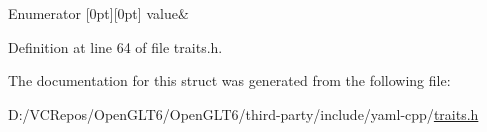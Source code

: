 \begin{DoxyEnumFields}{Enumerator}
[0pt][0pt]{}\mbox{\label{struct_y_a_m_l_1_1is__numeric_3_01unsigned_01long_01long_01_4_a06d934941bde954a8e4a73966195692aa8712886e1f4b535c8f4d37b136cf6298}} 
value&\\
\hline

\end{DoxyEnumFields}


Definition at line 64 of file traits.\+h.



The documentation for this struct was generated from the following file\+:\begin{DoxyCompactItemize}
\item 
D\+:/\+V\+C\+Repos/\+Open\+G\+L\+T6/\+Open\+G\+L\+T6/third-\/party/include/yaml-\/cpp/\mbox{\hyperlink{traits_8h}{traits.\+h}}\end{DoxyCompactItemize}

